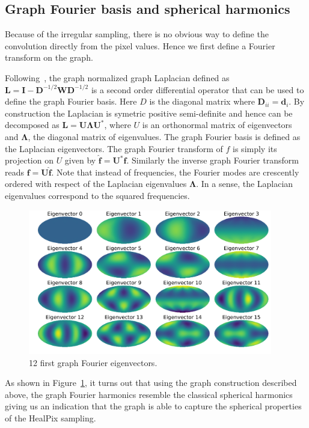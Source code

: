 \documentclass[final,twocolumn,3p,times,authoryear]{elsarticle}
\newcommand{\todo}[1]{{\color[rgb]{.6,.1,.6}{#1}}}
\renewcommand{\b}[1]{{\bm{#1}}}   %
\newcommand{\1}{\b{1}}              %
\newcommand{\0}{\b{0}}              %
\renewcommand{\L}{\b{L}} %
\newcommand{\W}{\b{W}}
\newcommand{\I}{\b{I}}
\newcommand{\D}{\b{D}}
\newcommand{\U}{\b{U}}
\newcommand{\bLambda}{\b{\Lambda}}
\begin{document}
\subsection{Graph Fourier basis and spherical harmonics}
\todo{Add a few extra references}

Because of the irregular sampling, there is no obvious way to define the convolution
directly from the pixel values. Hence we first define a Fourier transform on the
graph.

Following~\cite{shuman2013emerging}, the graph normalized graph Laplacian
defined as $\L = \I - \D^{-1/2} \W \D^{-1/2}$ is a second order differential operator
that can be used to define the graph Fourier basis. Here $D$ is the diagonal
matrix where $\D_{ii}=\b{d}_i$. By construction the Laplacian is symetric positive
semi-definite and hence can be decomposed as $\L=\U \bLambda \U^*$, where $U$ is an
orthonormal matrix of eigenvectors and $\bLambda$, the diagonal matrix of
eigenvalues. The graph Fourier basis is defined as the Laplacian eigenvectors.
The graph Fourier transform of $f$ is simply its projection on $U$ given by 
$\hat{\b{f}}=\U^*\b{f}$. Similarly the inverse graph Fourier transform reads $\b{f}=\U\hat{\b{f}}$.
Note that instead of frequencies, the Fourier modes are crescently ordered with
respect of the Laplacian eigenvalues $\bLambda$. In a sense, the Laplacian
eigenvalues correspond to the squared frequencies. 

\begin{figure}[!ht]
\centering
\includegraphics[width=0.95\textwidth]{figures/eigenvectors.pdf}
\caption{12 first graph Fourier eigenvectors.}
\label{fig:graph_harmonics}
\end{figure}

As shown in Figure~\ref{fig:graph_harmonics}, it turns out that using the graph
construction described above, the graph Fourier harmonics resemble the
classical spherical harmonics giving us an indication that the graph is able to
capture the spherical properties of the HealPix sampling.
\end{document}
